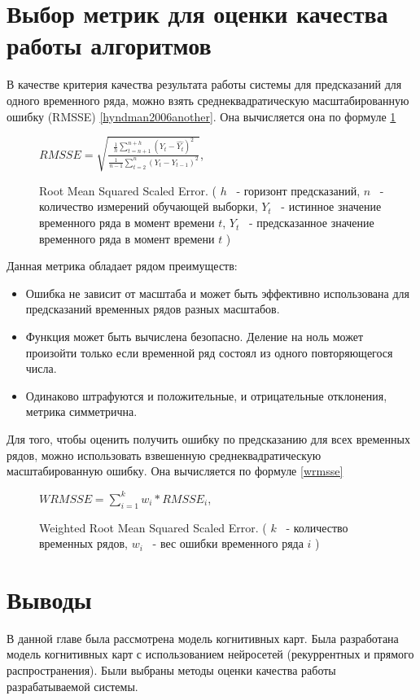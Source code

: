 \section{Выбор метрик для оценки качества работы алгоритмов}

В качестве критерия качества результата работы системы для предсказаний
для одного временного ряда, можно взять среднеквадратическую
масштабированную ошибку (RMSSE) \ref{hyndman2006another}.
Она вычисляется она по формуле \ref{img:rmsse}

\def\figurename{Формула}
\begin{figure}
	\centering
	$ RMSSE = \sqrt{ \frac{ \frac{1}{h} \sum_{t=n+1}^{n+h}(Y_t - \hat{Y_t})^2  }{ \frac{1}{n-1} \sum_{t=2}^{n} (Y_t - Y_{t-1})^2 } } $,

	\caption{Root Mean Squared Scaled Error.
	(
		$ h $ ~- горизонт предсказаний,
		$ n $ ~- количество измерений обучающей выборки,
		$ Y_t $ ~- истинное значение временного ряда в момент времени $ t $,
		$ \hat{Y_t} $ ~- предсказанное значение временного ряда в момент времени $ t $
	)}
	\label{img:rmsse}
\end{figure}
\def\figurename{Рис.}

Данная метрика обладает рядом преимуществ:

\begin{itemize}
	\item Ошибка не зависит от масштаба и может быть эффективно использована для предсказаний временных рядов разных масштабов.
	\item Функция может быть вычислена безопасно. Деление на ноль может произойти только если временной ряд состоял из одного повторяющегося числа.
	\item Одинаково штрафуются и положительные, и отрицательные отклонения, метрика симметрична.
\end{itemize}

Для того, чтобы оценить получить ошибку по предсказанию для всех временных рядов,
можно использовать взвешенную среднеквадратическую масштабированную ошибку.
Она вычисляется по формуле \ref{wrmsse}

\def\figurename{Формула}
\begin{figure}
	\centering
	$ WRMSSE = \sum_{i=1}^{k} w_i * RMSSE_i $,
	\caption{
		Weighted Root Mean Squared Scaled Error.
		(
			$ k $ ~- количество временных рядов,
			$ w_i $ ~- вес ошибки временного ряда $ i $
		)
	}
	\label{img:wrmsse}
\end{figure}
\def\figurename{Рис.}

\section{Выводы}

В данной главе была рассмотрена модель когнитивных карт.
Была разработана модель когнитивных карт
с использованием нейросетей (рекуррентных и прямого распространения).
Были выбраны методы оценки качества работы разрабатываемой системы.